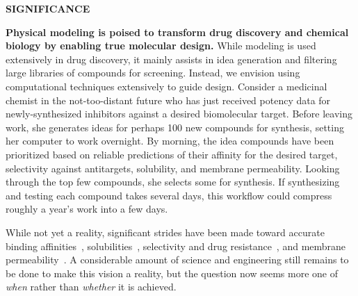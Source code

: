 \documentclass[11pt]{article}
\begin{document}




{\Large \bf SIGNIFICANCE}


\textbf{Physical modeling is poised to transform drug discovery and chemical biology by enabling true molecular design.}
While modeling is used extensively in drug discovery, it mainly assists in idea generation and filtering large libraries of compounds for screening. 
Instead, we envision using computational techniques extensively to guide design. 
Consider a medicinal chemist in the not-too-distant future who has just received potency data for newly-synthesized inhibitors against a desired biomolecular target. 
Before leaving work, she generates ideas for perhaps 100 new compounds for synthesis, setting her computer to work overnight. 
By morning, the idea compounds have been prioritized based on reliable predictions of their affinity for the desired target, selectivity against antitargets, solubility, and membrane permeability.  
Looking through the top few compounds, she selects some for synthesis. 
If synthesizing and testing each compound takes several days, this workflow could compress roughly a year's work into a few days.

While not yet a reality, significant strides have been made toward accurate binding affinities~\cite{mobley_perspective_2012, christ_accuracy_2014, deng_distinguishing_2015, Sherborne:2016:JComputAidedMolDes, schrodinger_accurate_2015, christ_binding_2016, cui_affinity_2016, verras_free_2016, Aldeghi:2017:J.Am.Chem.Soc.}, solubilities~\cite{Schnieders:2012:J.Chem.TheoryComput., park_absolute_2014, liu_using_2016}, selectivity and drug resistance~\cite{leonis_contribution_2013, Aldeghi:2017:J.Am.Chem.Soc.}, and membrane permeability~\cite{lee_permeability_2016, comer_permeability_2014}. 
A considerable amount of science and engineering still remains to be done to make this vision a reality, but the question now seems more one of \emph{when} rather than \emph{whether} it is achieved.
\end{document}
